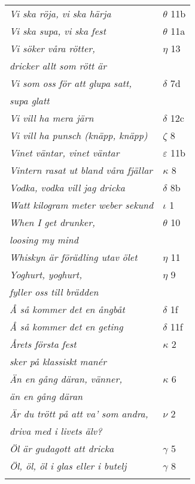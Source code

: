 \documentclass[a6paper,10pt]{article}
\begin{document}
\newpage
\begin{table}[!]
\begin{tabular}{l l}
\textit{Vi ska röja, vi ska härja}	&$\theta$ 11b\\
\textit{Vi ska supa, vi ska fest}	&$\theta$ 11a\\
\textit{Vi söker våra rötter,}	&$\eta$ 13\\
\textit{dricker allt som rött är} &\\
\textit{Vi som oss för att glupa satt,}	&$\delta$ 7d\\
\textit{supa glatt} &\\
\textit{Vi vill ha mera järn}	&$\delta$ 12c\\
\textit{Vi vill ha punsch (knäpp, knäpp)}	&$\zeta$ 8\\
\textit{Vinet väntar, vinet väntar}	&$\varepsilon$ 11b\\
\textit{Vintern rasat ut bland våra fjällar}	&$\kappa$ 8\\
\textit{Vodka, vodka vill jag dricka}	&$\delta$ 8b\\
\textit{Watt kilogram meter weber sekund}	&$\iota$ 1\\
\textit{When I get drunker,}	&$\theta$ 10\\
\textit{loosing my mind} &\\
\textit{Whiskyn är förädling utav ölet}	&$\eta$ 11\\
\textit{Yoghurt, yoghurt,}	&$\eta$ 9\\
\textit{fyller oss till brädden} &\\
\textit{Å så kommer det en ångbåt}	&$\delta$ 1f\\
\textit{Å så kommer det en geting}	&$\delta$ 11f\\
\textit{Årets första fest}	&$\kappa$ 2\\
\textit{sker på klassiskt manér} &\\
\textit{Än en gång däran, vänner,}	&$\kappa$ 6\\
\textit{än en gång däran} &\\
\textit{Är du trött på att va' som andra,}	&$\nu$ 2\\
\textit{driva med i livets älv?} &\\
\textit{Öl är gudagott att dricka}	&$\gamma$ 5\\
\textit{Öl, öl, öl i glas eller i butelj}	&$\gamma$ 8\\ 
\vspace{150pt}
\end{tabular}
\end{table}
\end{document}
